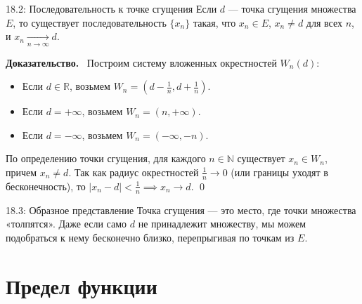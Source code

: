 \documentclass[a4paper,12pt]{article}
\newcommand{\myproof}{\textbf{Доказательство.}\ }
\begin{document}
	\begin{center}
	\end{center}
	
	\begin{theorembox}{18.2: Последовательность к точке сгущения}
		Если $d$ — точка сгущения множества $E$, то существует последовательность $\{x_n\}$ такая, что $x_n \in E$, $x_n \neq d$ для всех $n$, и $x_n \xrightarrow[n \to \infty]{} d$.
	\end{theorembox}
	
	\myproof
	Построим систему вложенных окрестностей $W_n(d)$:
	\begin{itemize}
		\item Если $d \in \mathbb{R}$, возьмем $W_n = (d - \frac{1}{n}, d + \frac{1}{n})$.
		\item Если $d = +\infty$, возьмем $W_n = (n, +\infty)$.
		\item Если $d = -\infty$, возьмем $W_n = (-\infty, -n)$.
	\end{itemize}
	По определению точки сгущения, для каждого $n \in \mathbb{N}$ существует $x_n \in W_n$, причем $x_n \neq d$. Так как радиус окрестностей $\frac{1}{n} \to 0$ (или границы уходят в бесконечность), то $|x_n - d| < \frac{1}{n} \implies x_n \to d$. \qed
	
	\vspace{0.5cm}
	\begin{notebook}{18.3: Образное представление}
		Точка сгущения — это место, где точки множества «толпятся». Даже если само $d$ не принадлежит множеству, мы можем подобраться к нему бесконечно близко, перепрыгивая по точкам из $E$.
	\end{notebook}
	
	
	
	
	
	
	
	\newpage
	\section{Предел функции}
	
\end{document}
